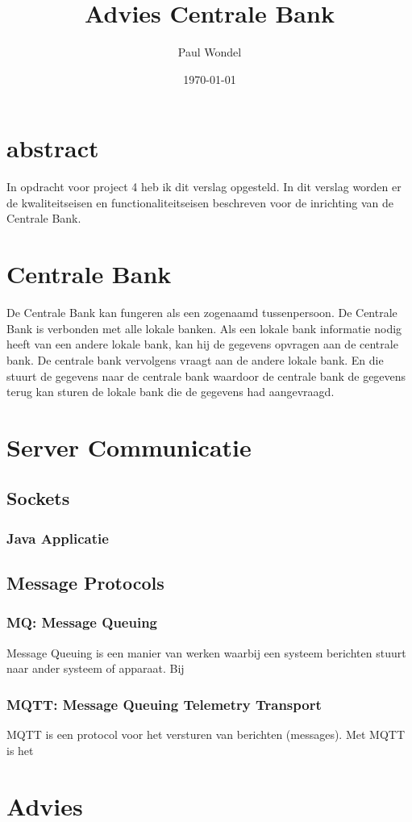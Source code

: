
\usepackage[dutch]{babel}



\title{Advies Centrale Bank}
\author{Paul Wondel}
\date{\today}
\maketitle

\section{abstract}
In opdracht voor project 4 heb ik dit verslag opgesteld.
In dit verslag worden er de kwaliteitseisen en functionaliteitseisen
beschreven voor de inrichting van de Centrale Bank.

\clearpage
\newpage

\section{Centrale Bank}
De Centrale Bank kan fungeren als een zogenaamd tussenpersoon.
De Centrale Bank is verbonden met alle lokale banken.
Als een lokale bank informatie nodig heeft van een andere lokale bank,
kan hij de gegevens opvragen aan de centrale bank.
De centrale bank vervolgens vraagt aan de andere lokale bank.
En die stuurt de gegevens naar de centrale bank waardoor de centrale bank
de gegevens terug kan sturen de lokale bank die de gegevens had aangevraagd.

\section{Server Communicatie}

\subsection{Sockets}

\subsubsection{Java Applicatie}

\subsection{Message Protocols}

\subsubsection{MQ: Message Queuing}
Message Queuing is een manier van werken waarbij een systeem berichten stuurt
naar ander systeem of apparaat. Bij 

\subsubsection{MQTT: Message Queuing Telemetry Transport}
MQTT is een protocol voor het versturen van berichten (messages).
Met MQTT is het 


\section{Advies}



